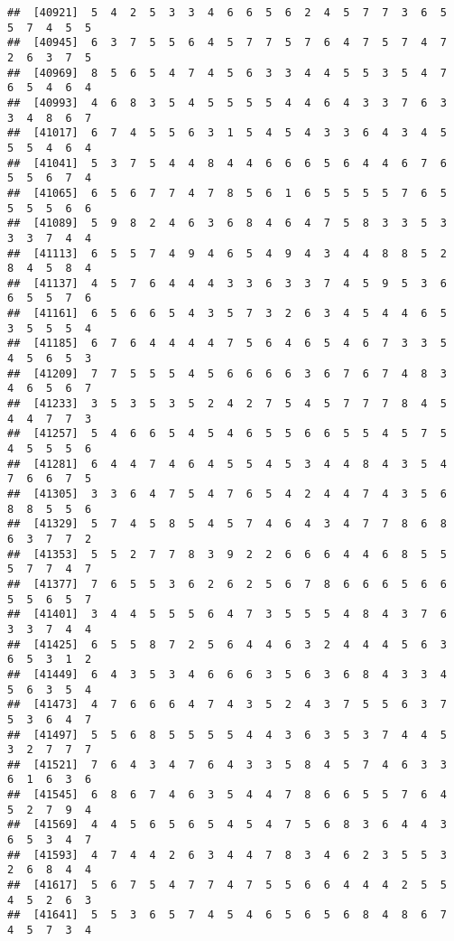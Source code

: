 \documentclass[
]{book}
\begin{document}
\begin{verbatim}
##  [40921]  5  4  2  5  3  3  4  6  6  5  6  2  4  5  7  7  3  6  5  5  7  4  5  5
##  [40945]  6  3  7  5  5  6  4  5  7  7  5  7  6  4  7  5  7  4  7  2  6  3  7  5
##  [40969]  8  5  6  5  4  7  4  5  6  3  3  4  4  5  5  3  5  4  7  6  5  4  6  4
##  [40993]  4  6  8  3  5  4  5  5  5  5  4  4  6  4  3  3  7  6  3  3  4  8  6  7
##  [41017]  6  7  4  5  5  6  3  1  5  4  5  4  3  3  6  4  3  4  5  5  5  4  6  4
##  [41041]  5  3  7  5  4  4  8  4  4  6  6  6  5  6  4  4  6  7  6  5  5  6  7  4
##  [41065]  6  5  6  7  7  4  7  8  5  6  1  6  5  5  5  5  7  6  5  5  5  5  6  6
##  [41089]  5  9  8  2  4  6  3  6  8  4  6  4  7  5  8  3  3  5  3  3  3  7  4  4
##  [41113]  6  5  5  7  4  9  4  6  5  4  9  4  3  4  4  8  8  5  2  8  4  5  8  4
##  [41137]  4  5  7  6  4  4  4  3  3  6  3  3  7  4  5  9  5  3  6  6  5  5  7  6
##  [41161]  6  5  6  6  5  4  3  5  7  3  2  6  3  4  5  4  4  6  5  3  5  5  5  4
##  [41185]  6  7  6  4  4  4  4  7  5  6  4  6  5  4  6  7  3  3  5  4  5  6  5  3
##  [41209]  7  7  5  5  5  4  5  6  6  6  6  3  6  7  6  7  4  8  3  4  6  5  6  7
##  [41233]  3  5  3  5  3  5  2  4  2  7  5  4  5  7  7  7  8  4  5  4  4  7  7  3
##  [41257]  5  4  6  6  5  4  5  4  6  5  5  6  6  5  5  4  5  7  5  4  5  5  5  6
##  [41281]  6  4  4  7  4  6  4  5  5  4  5  3  4  4  8  4  3  5  4  7  6  6  7  5
##  [41305]  3  3  6  4  7  5  4  7  6  5  4  2  4  4  7  4  3  5  6  8  8  5  5  6
##  [41329]  5  7  4  5  8  5  4  5  7  4  6  4  3  4  7  7  8  6  8  6  3  7  7  2
##  [41353]  5  5  2  7  7  8  3  9  2  2  6  6  6  4  4  6  8  5  5  5  7  7  4  7
##  [41377]  7  6  5  5  3  6  2  6  2  5  6  7  8  6  6  6  5  6  6  5  5  6  5  7
##  [41401]  3  4  4  5  5  5  6  4  7  3  5  5  5  4  8  4  3  7  6  3  3  7  4  4
##  [41425]  6  5  5  8  7  2  5  6  4  4  6  3  2  4  4  4  5  6  3  6  5  3  1  2
##  [41449]  6  4  3  5  3  4  6  6  6  3  5  6  3  6  8  4  3  3  4  5  6  3  5  4
##  [41473]  4  7  6  6  6  4  7  4  3  5  2  4  3  7  5  5  6  3  7  5  3  6  4  7
##  [41497]  5  5  6  8  5  5  5  5  4  4  3  6  3  5  3  7  4  4  5  3  2  7  7  7
##  [41521]  7  6  4  3  4  7  6  4  3  3  5  8  4  5  7  4  6  3  3  6  1  6  3  6
##  [41545]  6  8  6  7  4  6  3  5  4  4  7  8  6  6  5  5  7  6  4  5  2  7  9  4
##  [41569]  4  4  5  6  5  6  5  4  5  4  7  5  6  8  3  6  4  4  3  6  5  3  4  7
##  [41593]  4  7  4  4  2  6  3  4  4  7  8  3  4  6  2  3  5  5  3  2  6  8  4  4
##  [41617]  5  6  7  5  4  7  7  4  7  5  5  6  6  4  4  4  2  5  5  4  5  2  6  3
##  [41641]  5  5  3  6  5  7  4  5  4  6  5  6  5  6  8  4  8  6  7  4  5  7  3  4

\end{verbatim}
\end{document}
